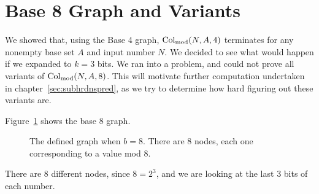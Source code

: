 \section{Base 8 Graph and Variants} \label{subsec:base8graphsubpblms}
We showed that, using the Base 4 graph, $\mathrm{Col}_{\text{mod}}(N,A,4)$ terminates for any nonempty base set $A$ and input number $N$. We decided to see what would happen if we expanded to $k = 3$ bits. We ran into a problem, and could not prove all variants of $\mathrm{Col}_{\text{mod}}(N,A,8)$. This will motivate further computation undertaken in chapter~\ref{sec:subhrdnspred}, as we try to determine how hard figuring out these variants are. \par
Figure~\ref{fig:base_8_graph} shows the base 8 graph.
\begin{figure}
    \centering
    \caption{The defined graph when $b = 8$. There are 8 nodes, each one corresponding to a value mod 8.}
    \label{fig:base_8_graph}
\end{figure}
There are 8 different nodes, since $8 = 2^3$, and we are looking at the last 3 bits of each number. 
